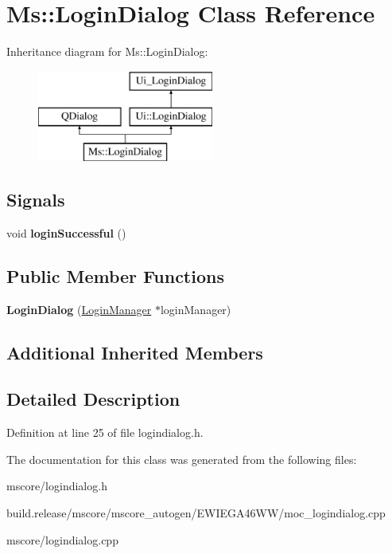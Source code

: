 \hypertarget{class_ms_1_1_login_dialog}{}\section{Ms\+:\+:Login\+Dialog Class Reference}
\label{class_ms_1_1_login_dialog}
Inheritance diagram for Ms\+:\+:Login\+Dialog\+:\begin{figure}[H]
\begin{center}
\leavevmode
\includegraphics[height=3.000000cm]{class_ms_1_1_login_dialog}
\end{center}
\end{figure}
\subsection*{Signals}
\begin{DoxyCompactItemize}
\item 
\mbox{\label{class_ms_1_1_login_dialog_ace7cf0367a691ff6a849a4d585ec4ef3}} 
void {\bfseries login\+Successful} ()
\end{DoxyCompactItemize}
\subsection*{Public Member Functions}
\begin{DoxyCompactItemize}
\item 
\mbox{\label{class_ms_1_1_login_dialog_a6ff6fc03356b892425f9d68694b2d7be}} 
{\bfseries Login\+Dialog} (\hyperlink{class_ms_1_1_login_manager}{Login\+Manager} $\ast$login\+Manager)
\end{DoxyCompactItemize}
\subsection*{Additional Inherited Members}


\subsection{Detailed Description}


Definition at line 25 of file logindialog.\+h.



The documentation for this class was generated from the following files\+:\begin{DoxyCompactItemize}
\item 
mscore/logindialog.\+h\item 
build.\+release/mscore/mscore\+\_\+autogen/\+E\+W\+I\+E\+G\+A46\+W\+W/moc\+\_\+logindialog.\+cpp\item 
mscore/logindialog.\+cpp\end{DoxyCompactItemize}
